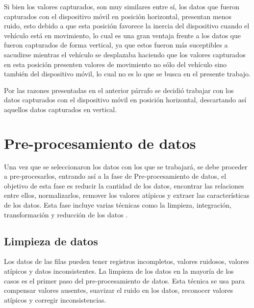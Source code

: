 \vspace{5mm} %

Si bien los valores capturados, son muy similares entre s\'{i}, los datos que fueron capturados con el dispositivo m\'{o}vil en posici\'{o}n horizontal, presentan menos ruido, esto debido a que esta posici\'{o}n favorece la inercia del dispositivo cuando el veh\'{i}culo est\'{a} en movimiento, lo cual es una gran ventaja frente a los datos que fueron capturados de forma vertical, ya que estos fueron m\'{a}s suceptibles a sacudirse mientras el veh\'{i}culo se desplazaba haciendo que los valores capturados en esta posici\'{o}n presenten valores de movimiento no s\'{o}lo del veh\'{i}culo sino tambi\'{e}n del dispositivo m\'{o}vil, lo cual no es lo que se busca en el presente trabajo.

\vspace{5mm} %

Por las razones presentadas en el anterior p\'{a}rrafo se decidi\'{o} trabajar con los datos capturados con el dispositivo m\'{o}vil en posici\'{o}n horizontal, descartando as\'{i} aquellos datos capturados en vertical.

\section{Pre-procesamiento de datos}

Una vez que se seleccionaron los datos con los que se trabajar\'{a}, se debe proceder a pre-procesarlos, entrando as\'{i} a la fase de Pre-procesamiento de datos, el objetivo de esta fase es reducir la cantidad de los datos, encontrar las relaciones entre ellos, normalizarlos, remover los valores at\'{i}picos y extraer las caracter\'{i}sticas de los datos. Esta fase incluye varias t\'{e}cnicas como la limpieza, integraci\'{o}n, transformaci\'{o}n y reducci\'{o}n de los datos \cite{Reference38}.

\subsection{Limpieza de datos}

Los datos de las filas pueden tener registros incompletos, valores ruidosos, valores at\'{i}picos y datos inconsistentes. La limpieza de los datos en la mayor\'{i}a de los casos es el primer paso del pre-procesamiento de datos. Esta t\'{e}cnica se usa para compensar valores ausentes, suavizar el ruido en los datos, reconocer valores at\'{i}picos y corregir inconsistencias.

